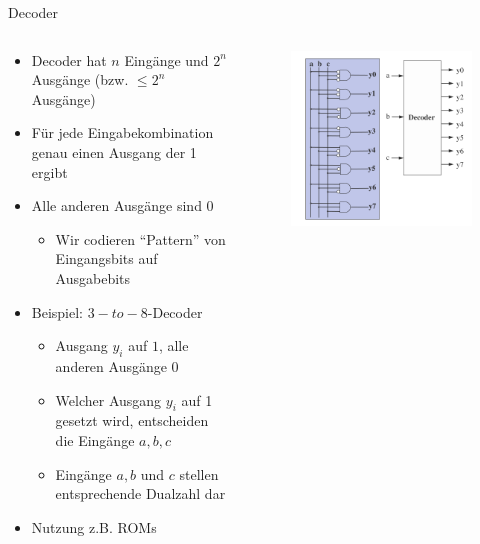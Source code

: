 \documentclass[12pt%
,xcolor=table
,aspectratio=169%
]{beamer}
\begin{document}
\begin{frame}{Decoder}
\begin{columns}[T] %
\begin{column}{.68\textwidth}
\begin{itemize}
	\item Decoder hat $n$ Eingänge und $2^n$ Ausgänge (bzw. $\leq 2^n$ Ausgänge)
	\item Für jede Eingabekombination genau einen Ausgang der 1 ergibt
	\item Alle anderen Ausgänge sind 0
	\begin{itemize}
		\item Wir codieren \enquote{Pattern} von Eingangsbits auf Ausgabebits
	\end{itemize}
	\item Beispiel: $3-to-8$-Decoder
	\begin{itemize}
		\item Ausgang $y_i$ auf $1$, alle anderen Ausgänge 0
	\item Welcher Ausgang $y_i$ auf 1 gesetzt wird, entscheiden die Eingänge $a,b,c$
	\item Eingänge $a, b$ und $c$ stellen entsprechende Dualzahl dar
	\end{itemize}
	\item Nutzung z.B. ROMs
\end{itemize}
\end{column}%
\hfill%
\begin{column}{.48\textwidth}
\centering
\vspace*{-1.7cm}
\begin{figure}
\includegraphics[scale=0.3]{pictures/decoder1}\\

\end{figure}
\end{column}
\end{columns}
\end{frame}
\end{document}

